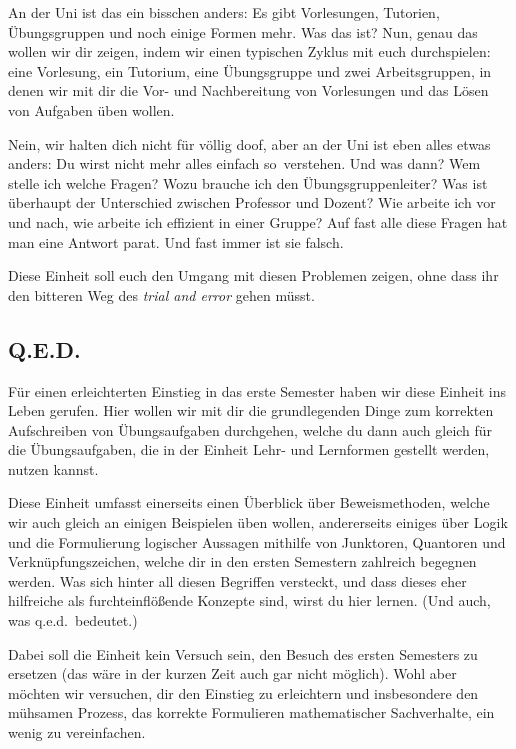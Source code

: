 An der Uni ist das ein bisschen anders: Es gibt Vorlesungen, Tutorien,
Übungsgruppen und noch einige Formen mehr. Was das ist? Nun, genau das wollen
wir dir zeigen, indem wir einen typischen Zyklus mit euch durchspielen: eine
Vorlesung, ein Tutorium, eine Übungsgruppe und zwei Arbeitsgruppen, in denen
wir mit dir die Vor- und Nachbereitung von Vorlesungen und das Lösen von
Aufgaben üben wollen.

Nein, wir halten dich nicht für völlig doof, aber an der Uni ist eben alles
etwas anders: Du wirst nicht mehr alles \glqq einfach so\grqq\ verstehen. Und
was dann? Wem stelle ich welche Fragen? Wozu brauche ich den
Übungsgruppenleiter? Was ist überhaupt der Unterschied zwischen Professor und
Dozent? Wie arbeite ich vor und nach, wie arbeite ich effizient in einer
Gruppe? Auf fast alle diese Fragen hat man eine Antwort parat. Und fast immer
ist sie falsch.

Diese Einheit soll euch den Umgang mit diesen Problemen zeigen, ohne dass ihr
den bitteren Weg des {\it trial and error} gehen müsst.

\subsection*{Q.E.D.}

Für einen erleichterten Einstieg in das erste Semester haben wir diese Einheit
ins Leben gerufen. Hier wollen wir mit dir die grundlegenden Dinge zum
korrekten Aufschreiben von Übungsaufgaben durchgehen, welche du dann auch
gleich für die Übungsaufgaben, die in der Einheit Lehr- und Lernformen gestellt
werden, nutzen kannst.

Diese Einheit umfasst einerseits einen Überblick über Beweismethoden, welche
wir auch gleich an einigen Beispielen üben wollen, andererseits einiges über
Logik und die Formulierung logischer Aussagen mithilfe von Junktoren, Quantoren
und Verknüpfungszeichen, welche dir in den ersten Semestern zahlreich begegnen
werden. Was sich hinter all diesen Begriffen versteckt, und dass dieses eher
hilfreiche als furchteinflößende Konzepte sind, wirst du hier lernen. (Und
auch, was \glqq q.e.d.\grqq\ bedeutet.)

Dabei soll die Einheit kein Versuch sein, den Besuch des ersten Semesters zu
ersetzen (das wäre in der kurzen Zeit auch gar nicht möglich). Wohl aber
möchten wir versuchen, dir den Einstieg zu erleichtern und insbesondere den
mühsamen Prozess, das korrekte Formulieren mathematischer Sachverhalte, ein
wenig zu vereinfachen.

